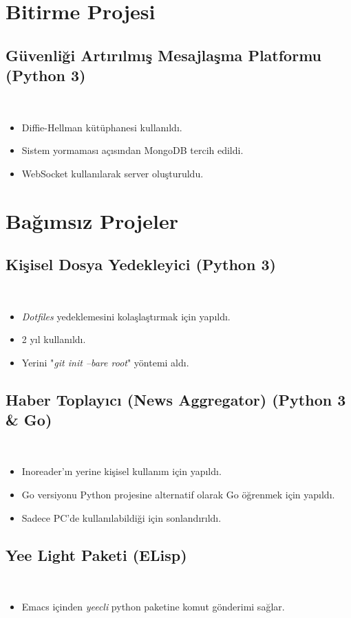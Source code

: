 \documentclass[a4paper, 9pt]{extarticle}
\begin{document}
\makebaslik{}
\myegitim{}
\mydeneyim{}

\section{Bitirme Projesi}
\subsection{Güvenliği Artırılmış Mesajlaşma Platformu (Python 3)}
\hfill \\
\begin{itemize}
\item Diffie-Hellman kütüphanesi kullanıldı.
\item Sistem yormaması açısından MongoDB tercih edildi.
\item WebSocket kullanılarak server oluşturuldu.
\end{itemize}

\section{Bağımsız Projeler}
\subsection{Kişisel Dosya Yedekleyici (Python 3)} \hfill \\
\begin{itemize}
\item \emph{Dotfiles} yedeklemesini kolaşlaştırmak için yapıldı.
\item 2 yıl kullanıldı.
\item Yerini "\emph{git init --bare root}" yöntemi aldı.
\end{itemize}

\subsection{Haber Toplayıcı (News Aggregator) (Python 3 \& Go)} \hfill \\
\begin{itemize}
\item Inoreader'ın yerine kişisel kullanım için yapıldı.
\item Go versiyonu Python projesine alternatif olarak Go öğrenmek için yapıldı.
\item Sadece PC'de kullanılabildiği için sonlandırıldı.
\end{itemize}

\subsection{Yee Light Paketi (ELisp)} \hfill \\
\begin{itemize}
\item Emacs içinden \emph{yeecli} python paketine komut gönderimi sağlar.
\end{itemize}
\end{document}
